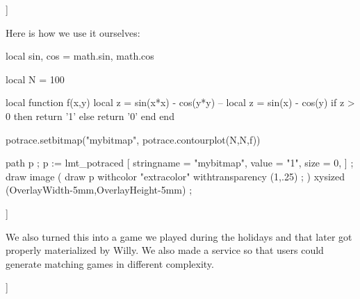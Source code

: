 \typebuffer[style=\switchtobodyfont[9pt]\ttbf]

\stoptitle

\starttitle[title=This year X-mas card (1)]

Here is how we use it ourselves:

\startbuffer[1]
\startluacode
local sin, cos = math.sin, math.cos

local N = 100

local function f(x,y)
    local z = sin(x*x) - cos(y*y)
 -- local z = sin(x) - cos(y)
    if z > 0 then
        return '1'
    else
        return '0'
    end
end

potrace.setbitmap("mybitmap", potrace.contourplot(N,N,f))
\stopluacode
\stopbuffer

\startbuffer
path p ; p := lmt_potraced [
    stringname = "mybitmap",
    value      = "1",
    size       = 0,
] ;
draw image (
    draw p withcolor "extracolor" withtransparency (1,.25) ;
) xysized (OverlayWidth-5mm,OverlayHeight-5mm) ;
\stopbuffer

\getbuffer[1]

\typebuffer[style=\switchtobodyfont[12pt]\ttbf]

We also turned this into a game we played during the holidays and that later got
properly materialized by Willy. We also made a service so that users could
generate matching games in different complexity.

\stoptitle

\starttitle[title=This year X-mas card (2)]

\typebuffer[1][style=\switchtobodyfont[12pt]\ttbf]

\stoptitle

\stopdocument
